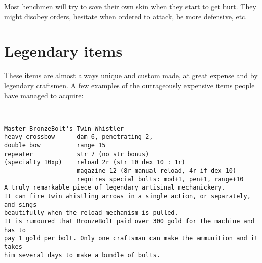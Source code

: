 Most henchmen will try to save their own skin when they start to get hurt. They might disobey orders, hesitate when ordered to attack, be more defensive, etc.









\section*{Legendary items}


These items are almost always unique and custom made, at great expense and by legendary craftsmen. A few examples of the outrageously expensive items people have managed to acquire:

\

\small \begin{verbatim}
Master BronzeBolt's Twin Whistler
heavy crossbow      dam 6, penetrating 2,
double bow          range 15
repeater            str 7 (no str bonus)
(specialty 10xp)    reload 2r (str 10 dex 10 : 1r)
                    magazine 12 (8r manual reload, 4r if dex 10)
                    requires special bolts: mod+1, pen+1, range+10
A truly remarkable piece of legendary artisinal mechanickery. 
It can fire twin whistling arrows in a single action, or separately, and sings
beautifully when the reload mechanism is pulled.
It is rumoured that BronzeBolt paid over 300 gold for the machine and has to 
pay 1 gold per bolt. Only one craftsman can make the ammunition and it takes 
him several days to make a bundle of bolts.
\end{verbatim} \normalsize


